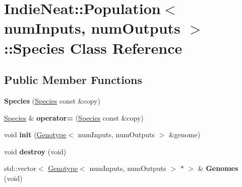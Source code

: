 \hypertarget{class_indie_neat_1_1_population_1_1_species}{}\section{Indie\+Neat\+:\+:Population$<$ num\+Inputs, num\+Outputs $>$\+:\+:Species Class Reference}
\label{class_indie_neat_1_1_population_1_1_species}
\subsection*{Public Member Functions}
\begin{DoxyCompactItemize}
\item 
\mbox{\label{class_indie_neat_1_1_population_1_1_species_a87fcfdfb63a564672b8394470f674982}} 
{\bfseries Species} (\hyperlink{class_indie_neat_1_1_population_1_1_species}{Species} const \&copy)
\item 
\mbox{\label{class_indie_neat_1_1_population_1_1_species_ad3529760d9ef0f297b10848bee5dd82e}} 
\hyperlink{class_indie_neat_1_1_population_1_1_species}{Species} \& {\bfseries operator=} (\hyperlink{class_indie_neat_1_1_population_1_1_species}{Species} const \&copy)
\item 
\mbox{\label{class_indie_neat_1_1_population_1_1_species_a927a6e3fbcadf1fd8dc70e0572f45397}} 
void {\bfseries init} (\hyperlink{class_indie_neat_1_1_genotype}{Genotype}$<$ num\+Inputs, num\+Outputs $>$ \&genome)
\item 
\mbox{\label{class_indie_neat_1_1_population_1_1_species_ad6237428aa0d689398451c6eed27058c}} 
void {\bfseries destroy} (void)
\item 
\mbox{\label{class_indie_neat_1_1_population_1_1_species_addd4db6f02889048d78cb230bc6be9e7}} 
std\+::vector$<$ \hyperlink{class_indie_neat_1_1_genotype}{Genotype}$<$ num\+Inputs, num\+Outputs $>$ $\ast$ $>$ \& {\bfseries Genomes} (void)
\item 
\mbox{\label{class_indie_neat_1_1_population_1_1_species_a98fafc1451a505d95963e0dc2f4555f8}} 

\end{DoxyCompactItemize}

